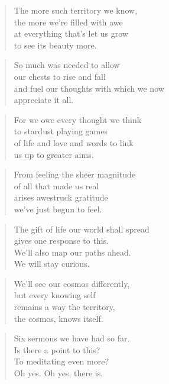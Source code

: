 \documentclass[14pt,a4paper]{article}
\begin{document}
\begin{verse}
The more such territory we know,\\
the more we’re filled with awe\\
at everything that’s let us grow\\
to see its beauty more.
\end{verse}

\begin{verse}
So much was needed to allow\\
our chests to rise and fall\\
and fuel our thoughts with which we now\\
appreciate it all.
\end{verse}

\begin{verse}
For we owe every thought we think\\
to stardust playing games\\
of life and love and words to link\\
us up to greater aims.
\end{verse}

\begin{verse}
From feeling the sheer magnitude\\
of all that made us real\\
arises awestruck gratitude\\
we’ve just begun to feel.
\end{verse}

\begin{verse}
The gift of life our world shall spread\\
gives one response to this.\\
We’ll also map our paths ahead.\\
We will stay curious.
\end{verse}

\begin{verse}
We’ll see our cosmos differently,\\
but every knowing self\\
remains a way the territory,\\
the cosmos, knows itself.
\end{verse}


\begin{verse}
Six sermons we have had so far.\\
Is there a point to this?\\
To meditating even more?\\
Oh yes. Oh yes, there is.
\end{verse}
\end{document}
